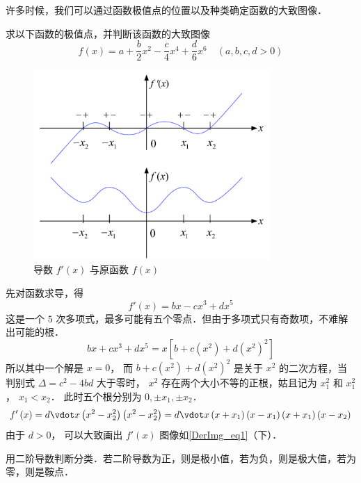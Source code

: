 

许多时候，我们可以通过函数极值点的位置以及种类确定函数的大致图像．

\begin{exam}{}
求以下函数的极值点，并判断该函数的大致图像
\begin{equation}
f\left( x \right) = a + \frac{b}{2}{x^2} - \frac{c}{4}{x^4} + \frac{d}{6}{x^6} \quad (a,b,c,d >0)
\end{equation}

\begin{figure}[h]
\centering
\includegraphics[width=9cm]{./figures/DerImg.pdf}
\caption{导数 $f'(x)$ 与原函数 $f(x)$}\label{DerImg_eq1}
\end{figure}

先对函数求导，得
\begin{equation}
f'\left( x \right) = bx - c{x^3} + d{x^5} 
\end{equation}
这是一个 $5$ 次多项式，最多可能有五个零点．但由于多项式只有奇数项，不难解出可能的根．
 \begin{equation}
bx + c{x^3} + d{x^5} = x[{b + c({x^2}) + d{{({x^2})}^2}} ]
\end{equation}
所以其中一个解是 $x = 0$， 而 $b + c({x^2}) + d{({x^2})^2}$ 是关于 ${x^2}$ 的二次方程，当判别式 $\Delta  = {c^2} - 4bd$ 大于零时， ${x^2}$ 存在两个大小不等的正根，姑且记为 $x_1^2$ 和 $x_1^2$， ${x_1} < {x_2}$． 
此时五个根分别为 $0, \pm {x_1},\pm {x_2}$． 
\begin{equation}
f'\left( x \right) = d \vdot x\left( {{x^2} - x_2^2} \right)\left( {{x^2} - x_2^2} \right) = d \vdot x\left( {x + {x_1}} \right)\left( {x - {x_1}} \right)\left( {x + {x_1}} \right)\left( {x - {x_2}} \right)
\end{equation} 
由于 $d > 0$， 可以大致画出 $f'(x)$ 图像如\autoref{DerImg_eq1}（下）．


用二阶导数判断分类．若二阶导数为正，则是极小值，若为负，则是极大值，若为零，则是鞍点．


\end{exam}